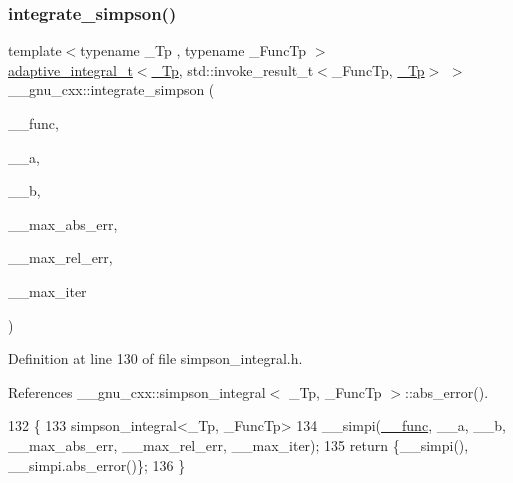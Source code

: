 \subsubsection{\texorpdfstring{integrate\+\_\+simpson()}{integrate\_simpson()}}
{\footnotesize\ttfamily template$<$typename \+\_\+\+Tp , typename \+\_\+\+Func\+Tp $>$ \\
\hyperlink{struct____gnu__cxx_1_1adaptive__integral__t}{adaptive\+\_\+integral\+\_\+t}$<$\hyperlink{namespace____gnu__cxx_a3b19a9c800ca194374ef9172290f7d79}{\+\_\+\+Tp}, std\+::invoke\+\_\+result\+\_\+t$<$\+\_\+\+Func\+Tp, \hyperlink{namespace____gnu__cxx_a3b19a9c800ca194374ef9172290f7d79}{\+\_\+\+Tp}$>$ $>$ \+\_\+\+\_\+gnu\+\_\+cxx\+::integrate\+\_\+simpson (\begin{DoxyParamCaption}\item[{\+\_\+\+Func\+Tp}]{\+\_\+\+\_\+func,  }\item[{\hyperlink{namespace____gnu__cxx_a3b19a9c800ca194374ef9172290f7d79}{\+\_\+\+Tp}}]{\+\_\+\+\_\+a,  }\item[{\hyperlink{namespace____gnu__cxx_a3b19a9c800ca194374ef9172290f7d79}{\+\_\+\+Tp}}]{\+\_\+\+\_\+b,  }\item[{\hyperlink{namespace____gnu__cxx_a3b19a9c800ca194374ef9172290f7d79}{\+\_\+\+Tp}}]{\+\_\+\+\_\+max\+\_\+abs\+\_\+err,  }\item[{\hyperlink{namespace____gnu__cxx_a3b19a9c800ca194374ef9172290f7d79}{\+\_\+\+Tp}}]{\+\_\+\+\_\+max\+\_\+rel\+\_\+err,  }\item[{int}]{\+\_\+\+\_\+max\+\_\+iter }\end{DoxyParamCaption})\hspace{0.3cm}{\ttfamily [inline]}}



Definition at line 130 of file simpson\+\_\+integral.\+h.



References \+\_\+\+\_\+gnu\+\_\+cxx\+::simpson\+\_\+integral$<$ \+\_\+\+Tp, \+\_\+\+Func\+Tp $>$\+::abs\+\_\+error().


\begin{DoxyCode}
132     \{
133       simpson\_integral<\_Tp, \_FuncTp>
134         \_\_simpi(\hyperlink{namespace____gnu__cxx_af2b2f0c7a2ae72b922b1afefae5a65b2}{\_\_func}, \_\_a, \_\_b, \_\_max\_abs\_err, \_\_max\_rel\_err, \_\_max\_iter);
135       \textcolor{keywordflow}{return} \{\_\_simpi(), \_\_simpi.abs\_error()\};
136     \}
\end{DoxyCode}
\mbox{\label{namespace____gnu__cxx_ab7b0961f8fb1553f8a70902b110a22ef}} 
